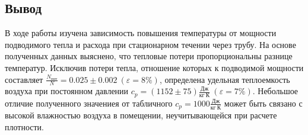 \documentclass[12pt,a4paper]{article}
\begin{document}
\subsection*{Вывод}
В ходе работы изучена зависимость повышения температуры от мощности подводимого тепла и расхода при стационарном течении через трубу. На основе полученных данных выяснено, что тепловые потери пропорциональны разнице температур. Исключив потери тепла, отношение которых к подводимой мощности составляет $\frac{N_{пот}}{N} = 0.025\pm0.002\ (\varepsilon = 8\%)$, определена удельная теплоемкость воздуха при постоянном давлении $c_p = (1152\pm75)\frac{Дж}{кг\ К}\ (\varepsilon = 7\%)$. Небольшое отличие полученного значениея от табличного $c_p = 1000\frac{Дж}{кг\ К}$ может быть связано с высокой влажностью воздуха в помещении, неучитывающейся при расчете плотности.
\end{document}
